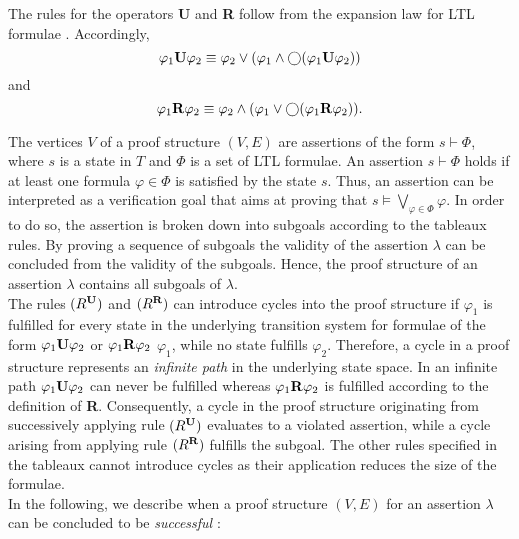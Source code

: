 \documentclass[a4paper, 12pt, twoside]{report}
\begin{document}
	The rules for the operators \textbf{U} and \textbf{R} follow from the expansion law for LTL formulae \cite{baier2008principles}. Accordingly,
	\[\varphi_1 \text{\textbf{U}} \varphi_2 \equiv \varphi_2 \vee (\varphi_1 \wedge \bigcirc (\varphi_1 \text{\textbf{U}} \varphi_2))\] and
	\[\varphi_1 \text{\textbf{R}} \varphi_2 \equiv \varphi_2 \wedge (\varphi_1 \vee \bigcirc (\varphi_1 \text{\textbf{R}} \varphi_2)).\]	
	
	The vertices $V$ of a proof structure $(V,E)$ are assertions of the form $s \vdash \Phi$, where $s$ is a state in $T$ and $\Phi$ is a set of LTL formulae. An assertion $s \vdash \Phi$ holds if at least one formula $\varphi \in \Phi$ is satisfied by the state $s$. Thus, an assertion can be interpreted as a verification goal that aims at proving that $s\models \bigvee_{\varphi \in \Phi}\varphi$. In order to do so, the assertion is broken down into subgoals according to the tableaux rules. By proving a sequence of subgoals the validity of the assertion $\lambda$ can be concluded from the validity of the subgoals. Hence, the proof structure of an assertion $\lambda$ contains all subgoals of $\lambda$. \\
	
	The rules $(R^{\text{\textbf{U}}})$ and $(R^{\text{\textbf{R}}})$ can introduce cycles into the proof structure if $\varphi_1$ is fulfilled for every state in the underlying transition system for formulae of the form $\varphi_1 \text{\textbf{U}} \varphi_2$ or $\varphi_1 \text{\textbf{R}} \varphi_2$ $\varphi_1$, while no state fulfills $\varphi_2$. Therefore, a cycle in a proof structure represents an \textit{infinite path} in the underlying state space. In an infinite path $\varphi_1 \text{\textbf{U}} \varphi_2$ can never be fulfilled whereas $\varphi_1 \text{\textbf{R}} \varphi_2$ is fulfilled according to the definition of \textbf{R}. Consequently, a cycle in the proof structure originating from successively applying rule $(R^{\text{\textbf{U}}})$ evaluates to a violated assertion, while a cycle arising from applying rule $(R^{\text{\textbf{R}}})$ fulfills the subgoal. The other rules specified in the tableaux cannot introduce cycles as their application reduces the size of the formulae. \\
	
	In the following, we describe when a proof structure $(V,E)$ for an assertion $\lambda$ can be concluded to be \textit{successful} \cite{bhat1995efficient}:
	
\end{document}
